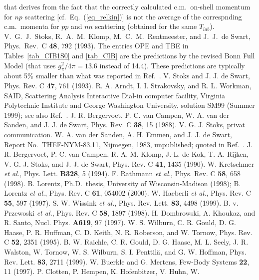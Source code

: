 \begin{references}
that derives from the fact that
the correctly calculated c.m.\ on-shell momentum for $np$ 
scattering [cf.\ Eq.~(\ref{eq_relkin})]
is not the average of the
correspnding c.m.\ momenta for $pp$ and $nn$ scattering (obtained for the same
$T_{lab}$).
 V.\ G.\ J.\ Stoks, R.\ A.\ M.\ Klomp, M.\ C.\ M.\ Rentmeester,
and J.\ J.\ de Swart, Phys.\ Rev.\ C {\bf 48}, 792 (1993).
The entries OPE and TBE in Tables~\ref{tab_CIB1S0} and \ref{tab_CIB}
are the predictions by the revised Bonn Full Model (that uses
$g^2_\pi/4\pi=13.6$ instead of 14.4). These predictions are typically
about 5\% smaller than what was reported in Ref.~\cite{LM98b}.
 V. Stoks and J. J. de Swart, Phys. Rev. C {\bf 47},
761 (1993).
R. A. Arndt, I. I. Strakovsky, and R. L. Workman,
SAID, Scattering Analysis Interactive Dial-in computer facility,
Virginia Polytechnic Institute and George Washington University,
solution SM99 (Summer 1999); see also Ref.~\cite{ASW94}.
 J. R. Bergervoet, P. C. van Campen, W. A. van der Sanden,
and J. J. de Swart, Phys. Rev. C {\bf 38}, 15 (1988).
 V. G. J. Stoks, privat communication.
 W. A. van der Sanden, A. H. Emmen, and J. J. de
Swart, Report No.\ THEF-NYM-83.11, Nijmegen, 1983, unpublished;
quoted in Ref.~\cite{Ber88}.
 J. R. Bergervoet, P. C. van Campen, R. A. M. Klomp,
J.-L. de Kok, T. A. Rijken, V. G. J. Stoks, and J. J. de Swart,
Phys. Rev. C {\bf 41}, 1435 (1990).
 W. Kretschmer {\it et al.}, Phys. Lett. {\bf B328}, 5 (1994).
 F. Rathmann {\it et al.}, Phys. Rev. C {\bf 58}, 658 (1998).
 B. Lorentz, Ph.D.\ thesis, University of Wisconsin-Madison
(1998); B. Lorentz {\it et al.}, Phys. Rev. C {\bf 61}, 054002 (2000).
 W. Haeberli {\it et al.}, Phys. Rev. C {\bf 55}, 597 (1997).
 S. W. Wissink {\it et al.}, Phys. Rev. Lett. {\bf 83}, 
4498 (1999).
 B. v. Przewoski {\it et al.}, Phys. Rev. C {\bf 58}, 
1897 (1998).
 H. Dombrowski, A. Khoukaz, and R. Santo, 
Nucl. Phys. {\bf A619}, 97 (1997).
 W. S. Wilburn, C. R. Gould, D. G. Haase, P. R. Huffman, C. D.
Keith, N. R. Roberson, and W. Tornow, Phys. Rev. C {\bf 52}, 2351 (1995).
 B. W. Raichle, C. R. Gould, D. G. Haase, M. L. Seely,
J. R. Walston, W. Tornow, W. S. Wilburn, S. I. Penttil\"a,
and G. W. Hoffman, Phys. Rev. Lett. {\bf 83}, 2711 (1999).
 W. Buerkle and G. Mertens, Few-Body Systems {\bf 22},
11 (1997).
 P. Clotten, P. Hempen, K. Hofenbitzer, V. Huhn, W.

\end{references}
